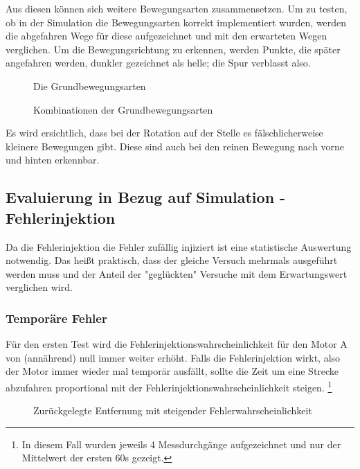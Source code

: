 {Aus diesen k{\"{o}}nnen sich weitere Bewegungsarten zusammensetzen. Um zu testen, ob in der Simulation die Bewegungsarten korrekt implementiert
wurden, werden die abgefahren Wege f{\"{u}}r diese aufgezeichnet und mit den erwarteten Wegen verglichen. Um die Bewegungsrichtung zu erkennen,
werden Punkte, die sp{\"{a}}ter angefahren werden, dunkler gezeichnet als helle; die Spur verblasst also.
\begin{figure}
	\centering
	\caption{Die Grundbewegungsarten}
	\label{fig:move1}
\end{figure}%
\begin{figure}
	\centering
	\caption{Kombinationen der Grundbewegungsarten}
	\label{fig:move2}
\end{figure}%

Es wird ersichtlich, dass bei der Rotation auf der Stelle es f{\"{a}}lschlicherweise kleinere Bewegungen gibt. Diese sind auch bei den reinen
Bewegung nach vorne und hinten erkennbar.

\subsection{Evaluierung in Bezug auf Simulation - Fehlerinjektion}
Da die Fehlerinjektion die Fehler zuf{\"{a}}llig injiziert ist eine statistische Auswertung notwendig. Das hei{\ss}t praktisch, dass
der gleiche Versuch mehrmals ausgef{\"{u}}hrt werden muss und der Anteil der "gegl{\"{u}}ckten" Versuche mit dem Erwartungswert
verglichen wird.

\subsubsection{Tempor{\"{a}}re Fehler}
F{\"{u}}r den ersten Test wird die Fehlerinjektionswahrscheinlichkeit f{\"{u}}r den Motor A von (ann{\"{a}}hrend) null immer
weiter erh{\"{o}}ht. Falls die Fehlerinjektion wirkt, also der Motor immer wieder mal tempor{\"{a}}r ausf{\"{a}}llt, sollte die
Zeit um eine Strecke abzufahren proportional mit der Fehlerinjektionswahrscheinlichkeit steigen.
\footnote{In diesem Fall wurden jeweils 4 Messdurchg{\"{a}}nge aufgezeichnet und nur der Mittelwert der ersten 60s gezeigt.}

\begin{figure}
	\centering
	\caption{Zur{\"{u}}ckgelegte Entfernung mit steigender Fehlerwahrscheinlichkeit}
	\label{fig:zemsf}
\end{figure}

}
